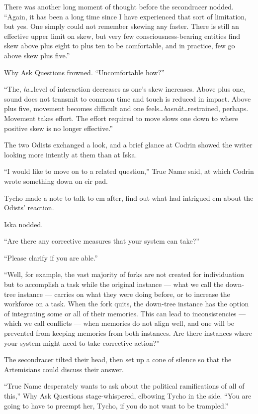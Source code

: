 There was another long moment of thought before the secondracer nodded. ``Again, it has been a long time since I have experienced that sort of limitation, but yes. One simply could not remember skewing any faster. There is still an effective upper limit on skew, but very few consciousness-bearing entities find skew above plus eight to plus ten to be comfortable, and in practice, few go above skew plus five.''

Why Ask Questions frowned. ``Uncomfortable how?''

``The, \emph{lu}\ldots level of interaction decreases as one's skew increases. Above plus one, sound does not transmit to common time and touch is reduced in impact. Above plus five, movement becomes difficult and one feels\ldots{}\emph{baenåt}\ldots restrained, perhaps. Movement takes effort. The effort required to move slows one down to where positive skew is no longer effective.''

The two Odists exchanged a look, and a brief glance at Codrin showed the writer looking more intently at them than at Iska.

``I would like to move on to a related question,'' True Name said, at which Codrin wrote something down on eir pad.

Tycho made a note to talk to em after, find out what had intrigued em about the Odists' reaction.

Iska nodded.

``Are there any corrective measures that your system can take?''

``Please clarify if you are able.''

``Well, for example, the vast majority of forks are not created for individuation but to accomplish a task while the original instance — what we call the down-tree instance — carries on what they were doing before, or to increase the workforce on a task. When the fork quits, the down-tree instance has the option of integrating some or all of their memories. This can lead to inconsistencies — which we call conflicts — when memories do not align well, and one will be prevented from keeping memories from both instances. Are there instances where your system might need to take corrective action?''

The secondracer tilted their head, then set up a cone of silence so that the Artemisians could discuss their answer.

``True Name desperately wants to ask about the political ramifications of all of this,'' Why Ask Questions stage-whispered, elbowing Tycho in the side. ``You are going to have to preempt her, Tycho, if you do not want to be trampled.''

